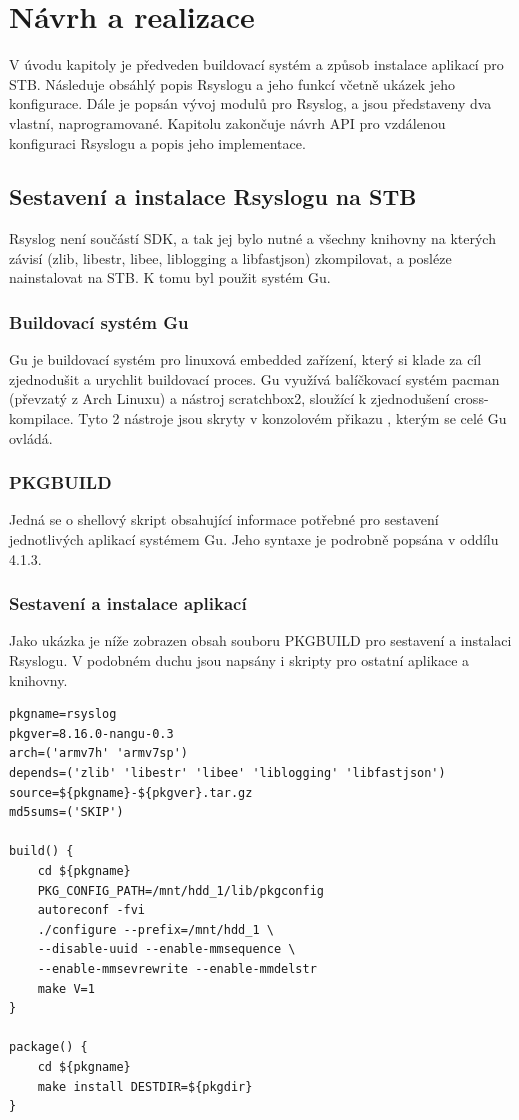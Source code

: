 \documentclass[thesis=B,czech]{FITthesis}[2012/06/26]
\begin{document}
\chapter{Návrh a realizace}
V úvodu kapitoly je předveden buildovací systém a způsob instalace aplikací pro STB.
Následuje obsáhlý popis Rsyslogu a jeho funkcí včetně ukázek jeho konfigurace.
Dále je popsán vývoj modulů pro Rsyslog, a jsou představeny dva vlastní, naprogramované.
Kapitolu zakončuje návrh API pro vzdálenou konfiguraci Rsyslogu a popis jeho implementace.

\section{Sestavení a instalace Rsyslogu na STB}
Rsyslog není součástí SDK, a tak jej bylo nutné a všechny knihovny na kterých závisí (zlib, libestr, libee, liblogging a libfastjson) zkompilovat, a posléze nainstalovat na STB. K tomu byl použit systém Gu.

\subsection{Buildovací systém Gu}
Gu je buildovací systém pro linuxová embedded zařízení, který si klade za cíl zjednodušit a urychlit buildovací proces. Gu využívá balíčkovací systém pacman (převzatý z Arch Linuxu) a nástroj scratchbox2, sloužící k zjednodušení cross-kompilace. Tyto 2 nástroje jsou skryty v konzolovém přikazu , kterým se celé Gu ovládá.

\subsection{PKGBUILD}
Jedná se o shellový skript obsahující informace potřebné pro sestavení jednotlivých aplikací systémem Gu. Jeho syntaxe je podrobně popsána v oddílu 4.1.3.
\clearpage 

\subsection{Sestavení a instalace aplikací}
Jako ukázka je níže zobrazen obsah souboru PKGBUILD pro sestavení a instalaci Rsyslogu. V podobném duchu jsou napsány i skripty pro ostatní aplikace a knihovny.
\begin{lstlisting}[style=PKGBuildStyle]
pkgname=rsyslog
pkgver=8.16.0-nangu-0.3
arch=('armv7h' 'armv7sp')
depends=('zlib' 'libestr' 'libee' 'liblogging' 'libfastjson')
source=${pkgname}-${pkgver}.tar.gz
md5sums=('SKIP')

build() {
	cd ${pkgname}
	PKG_CONFIG_PATH=/mnt/hdd_1/lib/pkgconfig
	autoreconf -fvi
	./configure --prefix=/mnt/hdd_1 \
	--disable-uuid --enable-mmsequence \
	--enable-mmsevrewrite --enable-mmdelstr
	make V=1
}

package() {
	cd ${pkgname}
	make install DESTDIR=${pkgdir}
}
\end{lstlisting}
\end{document}
